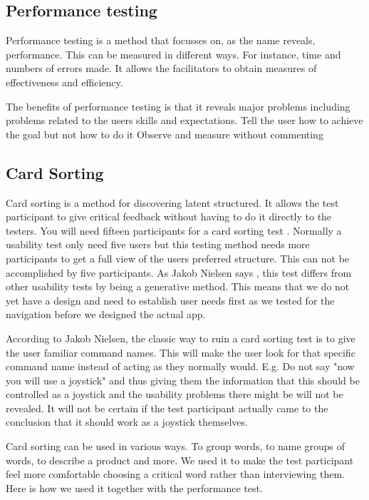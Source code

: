 \subsection{Performance testing}

Performance testing is a method that focusses on, as the name reveals, performance. This can be measured in different ways. For instance, time and numbers of errors made.
It allows the facilitators to obtain measures of effectiveness and efficiency. \cite{performance}

The benefits of performance testing is that it reveals major problems including problems related to the users skills and expectations. \cite{performance}
Tell the user how to achieve the goal but not how to do it \cite{} 
Observe and measure without commenting\cite{}

\subsection{Card Sorting}
Card sorting is a method for discovering latent structured. \cite{cards}
It allows the test participant to give critical feedback without having to do it directly to the testers. 
You will need fifteen participants for a card sorting test \cite{cardSorting}. Normally a usability test only need five users but this testing method needs more participants to get a full view of the users preferred structure. This can not be accomplished by five participants. \cite{cardSorting}
As Jakob Nielsen says \cite{cardSorting}, this test differs from other usability tests by being a generative method. This means that we do not yet have a design and need to establish user needs first as we tested for the navigation before we designed the actual app. 

According to Jakob Nielsen, the classic way to ruin a card sorting test is to give the user familiar command names. This will make the user look for that specific command name instead of acting as they normally would.\cite{cardSorting}
E.g. Do not say "now you will use a joystick" and thus giving them the information that this should be controlled as a joystick and the usability problems there might be will not be revealed. It will not be certain if the test participant actually came to the conclusion that it should work as a joystick
themselves. 

Card sorting can be used in various ways. To group words, to name groups of words, to describe a product and more. 
We used it to make the test participant feel more comfortable choosing a critical word rather than interviewing them. 
Here is how we used it together with the performance test.

